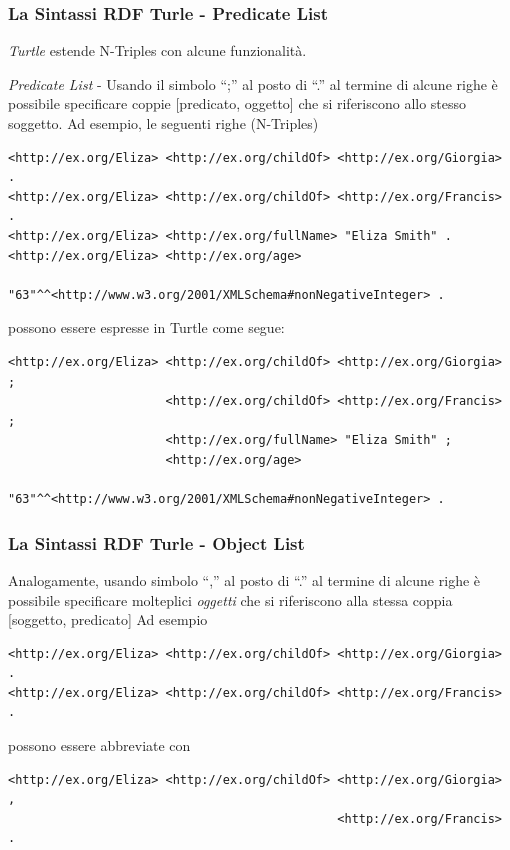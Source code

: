 \documentclass[8pt]{beamer}
\begin{document}
\begin{frame}[fragile]
 \frametitle{La Sintassi RDF Turle - Predicate List}
 
\emph{Turtle} estende N-Triples con alcune funzionalit\`a.
\vspace{\baselineskip}

\emph{Predicate List} - Usando il simbolo ``;'' al posto di ``.'' al termine di alcune righe \`e possibile
specificare coppie [predicato, oggetto] che si riferiscono allo stesso soggetto. Ad esempio, le seguenti
righe (N-Triples)

\begin{Verbatim}[fontsize=\small]
<http://ex.org/Eliza> <http://ex.org/childOf> <http://ex.org/Giorgia> .
<http://ex.org/Eliza> <http://ex.org/childOf> <http://ex.org/Francis> .
<http://ex.org/Eliza> <http://ex.org/fullName> "Eliza Smith" .
<http://ex.org/Eliza> <http://ex.org/age> 
                        "63"^^<http://www.w3.org/2001/XMLSchema#nonNegativeInteger> .
\end{Verbatim}

possono essere espresse in Turtle come segue:
\begin{Verbatim}[fontsize=\small]
<http://ex.org/Eliza> <http://ex.org/childOf> <http://ex.org/Giorgia> ;
                      <http://ex.org/childOf> <http://ex.org/Francis> ;
                      <http://ex.org/fullName> "Eliza Smith" ;
                      <http://ex.org/age> 
                         "63"^^<http://www.w3.org/2001/XMLSchema#nonNegativeInteger> .
\end{Verbatim}
\end{frame}

\begin{frame}[fragile]
 \frametitle{La Sintassi RDF Turle - Object List}
Analogamente, usando simbolo ``,'' al posto di ``.'' al termine di alcune righe \`e possibile
specificare molteplici \emph{oggetti} che si riferiscono alla stessa coppia [soggetto, predicato]
Ad esempio

\begin{Verbatim}[fontsize=\small]
<http://ex.org/Eliza> <http://ex.org/childOf> <http://ex.org/Giorgia> .
<http://ex.org/Eliza> <http://ex.org/childOf> <http://ex.org/Francis> .
\end{Verbatim}

possono essere abbreviate con
\begin{Verbatim}[fontsize=\small]
<http://ex.org/Eliza> <http://ex.org/childOf> <http://ex.org/Giorgia> ,
                                              <http://ex.org/Francis> .
\end{Verbatim}
\end{frame}
 
\end{document}
